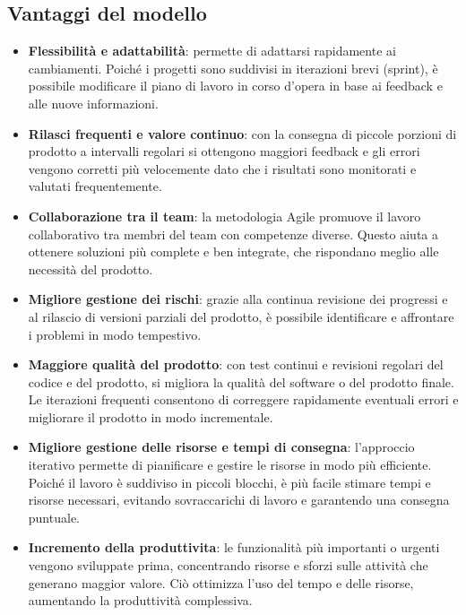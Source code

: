 \documentclass{article}
\begin{document}
    \subsection{Vantaggi del modello}
    \begin{itemize}
        \item \textbf{Flessibilità e adattabilità}: permette di adattarsi rapidamente ai cambiamenti. Poiché i progetti sono suddivisi in iterazioni brevi (sprint), è possibile modificare il piano di lavoro in corso d'opera in base ai feedback e alle nuove informazioni.
        \item \textbf{Rilasci frequenti e valore continuo}: con la consegna di piccole porzioni di prodotto a intervalli regolari si ottengono maggiori feedback e gli errori vengono corretti più velocemente dato che i risultati sono monitorati e valutati frequentemente.
        \item \textbf{Collaborazione tra il team}: la metodologia Agile promuove il lavoro collaborativo tra membri del team con competenze diverse. Questo aiuta a ottenere soluzioni più complete e ben integrate, che rispondano meglio alle necessità del prodotto.
        \item \textbf{Migliore gestione dei rischi}: grazie alla continua revisione dei progressi e al rilascio di versioni parziali del prodotto, è possibile identificare e affrontare i problemi in modo tempestivo.
        \item \textbf{Maggiore qualità del prodotto}: con test continui e revisioni regolari del codice e del prodotto, si migliora la qualità del software o del prodotto finale. Le iterazioni frequenti consentono di correggere rapidamente eventuali errori e migliorare il prodotto in modo incrementale.
        \item \textbf{Migliore gestione delle risorse e tempi di consegna}: l'approccio iterativo permette di pianificare e gestire le risorse in modo più efficiente. Poiché il lavoro è suddiviso in piccoli blocchi, è più facile stimare tempi e risorse necessari, evitando sovraccarichi di lavoro e garantendo una consegna puntuale.
        \item \textbf{Incremento della produttivita}: le funzionalità più importanti o urgenti vengono sviluppate prima, concentrando risorse e sforzi sulle attività che generano maggior valore. Ciò ottimizza l'uso del tempo e delle risorse, aumentando la produttività complessiva.
    \end{itemize}
\end{document}
